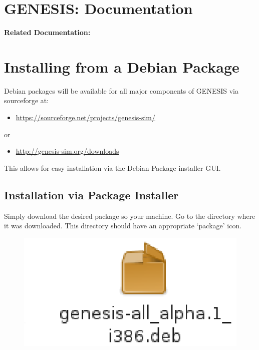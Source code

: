 \documentclass[12pt]{article}
\begin{document}
\section*{GENESIS: Documentation}

{\bf Related Documentation:}

\section*{Installing from a Debian Package}

Debian packages will be available for all major components of GENESIS via sourceforge at:
\begin{itemize}
   \item[]\href{https://sourceforge.net/projects/genesis-sim/}{https://sourceforge.net/projects/genesis-sim/}
\end{itemize}
\noindent or
\begin{itemize}
   \item[]\href{http://genesis-sim.org/downloads}{http://genesis-sim.org/downloads}
\end{itemize}
This allows for easy installation via the Debian Package installer GUI.

\subsection*{Installation via Package Installer}

Simply download the desired package so your machine. Go to the directory where it was downloaded. This directory should have an appropriate `package' icon.

\begin{figure}[h]
   \centering
   \includegraphics[scale=1]{figures/install-user-deb-icon.eps}
\end{figure}
\end{document}
